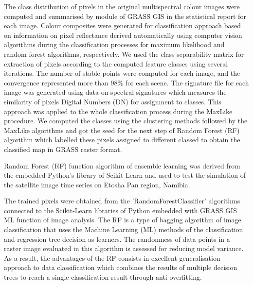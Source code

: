 \documentclass[climate,article,submit,pdftex,moreauthors]{Definitions/mdpi}
\begin{document}
The class distribution of pixels in the original multispectral colour images were computed and summarised by module of GRASS GIS in the statistical report for each image. Colour composites were generated for classification approach based on information on pixel reflectance derived automatically using computer vision algorithms during the classification processes for maximum likelihood and random forest algorithms, respectively. We used the class separability matrix for extraction of pixels according to the computed feature classes using several iterations. The number of stable points were computed for each image, and the convergence represented more than 98\% for each scene. The signature file for each image was generated using data on spectral signatures which measures the similarity  of pixels Digital Numbers (DN) for assignment to classes. This approach was applied to the whole classification process during the MaxLike procedure. We computed the classes using the clustering methods followed by the MaxLike algorithms and got the seed for the next step of Random Forest (RF) algorithm which labelled these pixels assigned to different classed to obtain the classified map in GRASS raster format. 

Random Forest (RF) function algorithm of ensemble learning was derived from the embedded Python's library of Scikit-Learn and used to test the simulation of the satellite image time series on Etosha Pan region, Namibia. 

The trained pixels were obtained from the 'RandomForestClassifier' algorithms connected to the Scikit-Learn libraries of Python \cite{Pedregosa} embedded with GRASS GIS ML function of image analysis. The RF is a type of bagging algorithm of image classification that uses the Machine Learning (ML) methods of the classification and regression tree decision as learners. The randomness of data points in a raster image evaluated in this algorithm is assessed for reducing model variance. As a result, the advantages of the RF consists in excellent generalisation approach to data classification which combines the results of multiple decision trees to reach a single classification result through anti-overfitting. 
\end{document}
